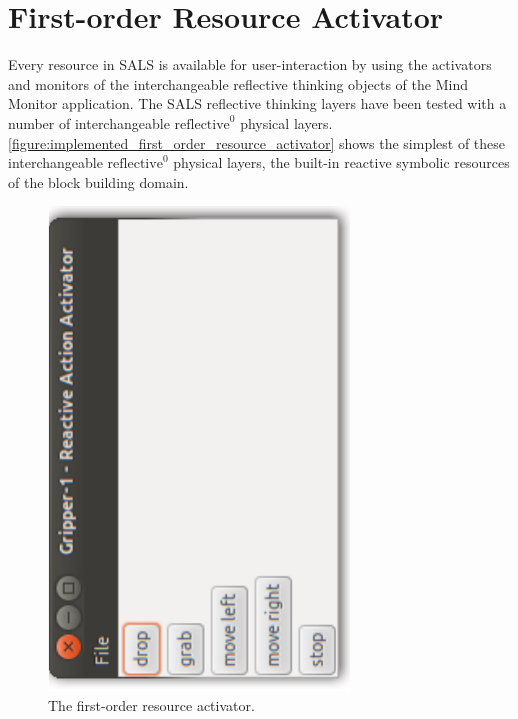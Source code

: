 \section{First-order Resource Activator}

Every resource in SALS is available for user-interaction by using the
activators and monitors of the interchangeable reflective thinking
objects of the Mind Monitor application.  The SALS reflective thinking
layers have been tested with a number of interchangeable
$\text{reflective}^0$ physical layers.
{\mbox{\autoref{figure:implemented_first_order_resource_activator}}}
shows the simplest of these interchangeable $\text{reflective}^0$
physical layers, the built-in reactive symbolic resources of the block
building domain.
\begin{figure}
\begin{center}
\includegraphics[width=8cm]{gfx/implemented_first_order_resource_activator}
\end{center}
\caption[The first-order resource activator.]{The first-order resource
  activator.}
\label{figure:implemented_first_order_resource_activator}
\end{figure}

